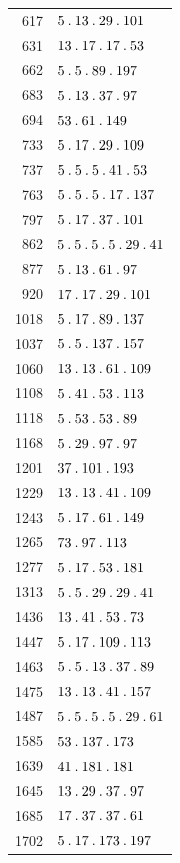 \begin{longtable}{@{}r|l@{}}
617 & $5\mathbin{.} 13\mathbin{.} 29\mathbin{.} 101$\\
631 & $13\mathbin{.} 17\mathbin{.} 17\mathbin{.} 53$\\
662 & $5\mathbin{.} 5\mathbin{.} 89\mathbin{.} 197$\\
683 & $5\mathbin{.} 13\mathbin{.} 37\mathbin{.} 97$\\
694 & $53\mathbin{.} 61\mathbin{.} 149$\\
733 & $5\mathbin{.} 17\mathbin{.} 29\mathbin{.} 109$\\
737 & $5\mathbin{.} 5\mathbin{.} 5\mathbin{.} 41\mathbin{.} 53$\\
763 & $5\mathbin{.} 5\mathbin{.} 5\mathbin{.} 17\mathbin{.} 137$\\
797 & $5\mathbin{.} 17\mathbin{.} 37\mathbin{.} 101$\\
862 & $5\mathbin{.} 5\mathbin{.} 5\mathbin{.} 5\mathbin{.} 29\mathbin{.} 41$\\
877 & $5\mathbin{.} 13\mathbin{.} 61\mathbin{.} 97$\\
920 & $17\mathbin{.} 17\mathbin{.} 29\mathbin{.} 101$\\
1018 & $5\mathbin{.} 17\mathbin{.} 89\mathbin{.} 137$\\
1037 & $5\mathbin{.} 5\mathbin{.} 137\mathbin{.} 157$\\
1060 & $13\mathbin{.} 13\mathbin{.} 61\mathbin{.} 109$\\
1108 & $5\mathbin{.} 41\mathbin{.} 53\mathbin{.} 113$\\
1118 & $5\mathbin{.} 53\mathbin{.} 53\mathbin{.} 89$\\
1168 & $5\mathbin{.} 29\mathbin{.} 97\mathbin{.} 97$\\
1201 & $37\mathbin{.} 101\mathbin{.} 193$\\
1229 & $13\mathbin{.} 13\mathbin{.} 41\mathbin{.} 109$\\
1243 & $5\mathbin{.} 17\mathbin{.} 61\mathbin{.} 149$\\
1265 & $73\mathbin{.} 97\mathbin{.} 113$\\
1277 & $5\mathbin{.} 17\mathbin{.} 53\mathbin{.} 181$\\
1313 & $5\mathbin{.} 5\mathbin{.} 29\mathbin{.} 29\mathbin{.} 41$\\
1436 & $13\mathbin{.} 41\mathbin{.} 53\mathbin{.} 73$\\
1447 & $5\mathbin{.} 17\mathbin{.} 109\mathbin{.} 113$\\
1463 & $5\mathbin{.} 5\mathbin{.} 13\mathbin{.} 37\mathbin{.} 89$\\
1475 & $13\mathbin{.} 13\mathbin{.} 41\mathbin{.} 157$\\
1487 & $5\mathbin{.} 5\mathbin{.} 5\mathbin{.} 5\mathbin{.} 29\mathbin{.} 61$\\
1585 & $53\mathbin{.} 137\mathbin{.} 173$\\
1639 & $41\mathbin{.} 181\mathbin{.} 181$\\
1645 & $13\mathbin{.} 29\mathbin{.} 37\mathbin{.} 97$\\
1685 & $17\mathbin{.} 37\mathbin{.} 37\mathbin{.} 61$\\
1702 & $5\mathbin{.} 17\mathbin{.} 173\mathbin{.} 197$\\

\end{longtable}
